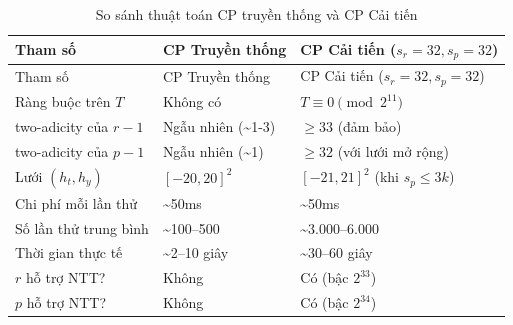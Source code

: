 \begin{longtable}[]{@{}
  >{\raggedright\arraybackslash}p{}
  >{\raggedright\arraybackslash}p{}
  >{\raggedright\arraybackslash}p{}@{}}
\caption{So sánh thuật toán CP truyền thống và CP Cải
tiến}\tabularnewline
\toprule\noalign{}
\begin{minipage}[b]{\linewidth}\raggedright
Tham số
\end{minipage} & \begin{minipage}[b]{\linewidth}\raggedright
CP Truyền thống
\end{minipage} & \begin{minipage}[b]{\linewidth}\raggedright
CP Cải tiến (\(s_r = 32, s_p = 32\))
\end{minipage} \\
\midrule\noalign{}
\endfirsthead
\toprule\noalign{}
\begin{minipage}[b]{\linewidth}\raggedright
Tham số
\end{minipage} & \begin{minipage}[b]{\linewidth}\raggedright
CP Truyền thống
\end{minipage} & \begin{minipage}[b]{\linewidth}\raggedright
CP Cải tiến (\(s_r = 32, s_p = 32\))
\end{minipage} \\
\midrule\noalign{}
\endhead
\bottomrule\noalign{}
\endlastfoot
Ràng buộc trên \(T\) & Không có & \(T \equiv 0 \pmod{2^{11}}\) \\
two-adicity của \(r-1\) & Ngẫu nhiên (\textasciitilde1-3) & \(\geq 33\)
(đảm bảo) \\
two-adicity của \(p-1\) & Ngẫu nhiên (\textasciitilde1) & \(\geq 32\)
(với lưới mở rộng) \\
Lưới \((h_t, h_y)\) & \([-20, 20]^2\) & \([-21, 21]^2\) (khi
\(s_p \leq 3k\)) \\
Chi phí mỗi lần thử & \textasciitilde50ms & \textasciitilde50ms \\
Số lần thử trung bình & \textasciitilde100--500 &
\textasciitilde3.000--6.000 \\
Thời gian thực tế & \textasciitilde2--10 giây & \textasciitilde30--60
giây \\
\(r\) hỗ trợ NTT? & Không & Có (bậc \(2^{33}\)) \\
\(p\) hỗ trợ NTT? & Không & Có (bậc \(2^{34}\)) \\
\end{longtable}

